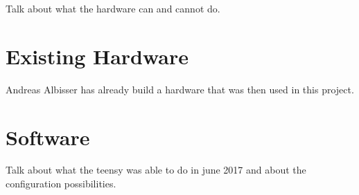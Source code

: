 %
%
Talk about what the hardware can and cannot do.
\section{Existing Hardware}
Andreas Albisser has already build a hardware that was then used in this project.
\section{Software}
Talk about what the teensy was able to do in june 2017 and about the configuration possibilities.